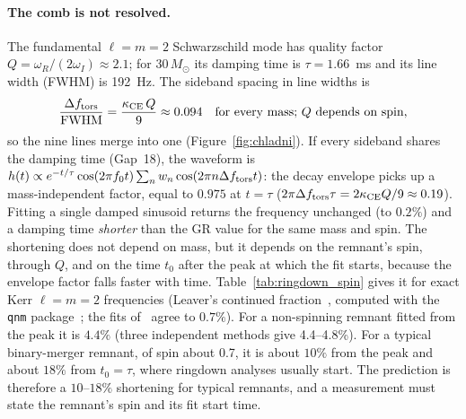 \documentclass[11pt,a4paper]{article}
\begin{document}
\paragraph{The comb is not resolved.} The fundamental $\ell = m = 2$ Schwarzschild
mode has quality factor $Q = \omega_R/(2\omega_I) \approx 2.1$; for $30\,M_\odot$ its
damping time is $\tau = 1.66$~ms and its line width (FWHM) is 192~Hz. The sideband
spacing in line widths is
\begin{equation}
  \frac{\Delta f_{\rm tors}}{\rm FWHM} = \frac{\kappa_{\rm CE}\,Q}{9} \approx 0.094
  \quad\text{for every mass; $Q$ depends on spin},
  \label{eq:comb_ratio}
\end{equation}
so the nine lines merge into one (Figure~\ref{fig:chladni}). If every sideband
shares the damping time (Gap~18), the waveform is
$h(t) \propto e^{-t/\tau}\cos(2\pi f_0 t)\sum_n w_n\cos(2\pi n\Delta f_{\rm tors} t)$:
the decay envelope picks up a mass-independent factor, equal to $0.975$ at $t = \tau$
($2\pi\Delta f_{\rm tors}\tau = 2\kappa_{\rm CE}Q/9 \approx 0.19$). Fitting a single
damped sinusoid returns the frequency unchanged (to $0.2\%$) and a damping time
\emph{shorter} than the GR value for the same mass and spin. The shortening does not
depend on mass, but it depends on the remnant's spin, through $Q$, and on the time
$t_0$ after the peak at which the fit starts, because the envelope factor falls faster
with time. Table~\ref{tab:ringdown_spin} gives it for exact Kerr $\ell = m = 2$
frequencies (Leaver's continued fraction~\cite{Leaver1985}, computed with the
\texttt{qnm} package~\cite{Stein2019}; the fits of~\cite{BertiCardosoWill2006} agree
to $0.7\%$). For a non-spinning remnant fitted from the peak it is $4.4\%$ (three
independent methods give 4.4--4.8\%). For a typical binary-merger remnant, of spin
about 0.7, it is about $10\%$ from the peak and about $18\%$ from $t_0 = \tau$, where
ringdown analyses usually start. The prediction is therefore a $10$--$18\%$
shortening for typical remnants, and a measurement must state the remnant's spin and
its fit start time.
\end{document}
